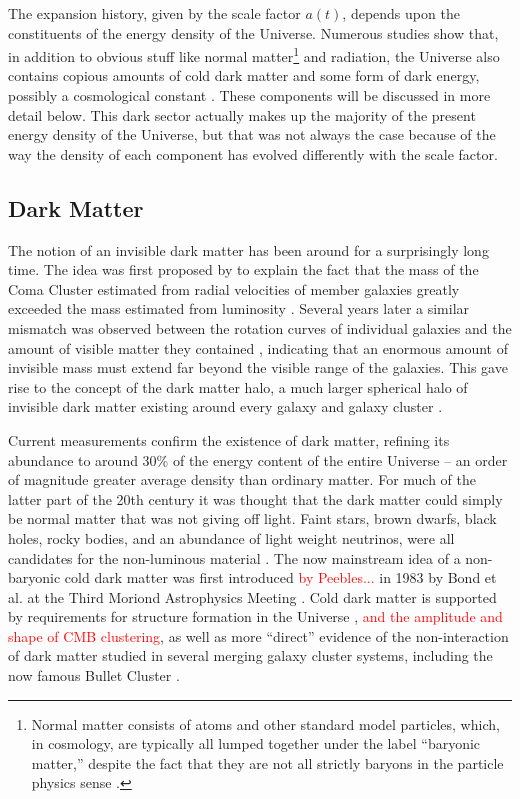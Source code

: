 The expansion history, given by the scale factor $a(t)$, depends upon the constituents of the energy density of the Universe. Numerous studies show that, in addition to obvious stuff like normal matter\footnote{Normal matter consists of atoms and other standard model particles, which, in cosmology, are typically all lumped together under the label ``baryonic matter,'' despite the fact that they are not all strictly baryons in the particle physics sense \citep{RydenText}.} and radiation, the Universe also contains copious amounts of cold dark matter and some form of dark energy, possibly a cosmological constant \citep[e.g.][]{DodelsonText}. These components will be discussed in more detail below. This dark sector actually makes up the majority of the present energy density of the Universe, but that was not always the case because of the way the density of each component has evolved differently with the scale factor.

\subsection{Dark Matter}
\label{sec:DM}

The notion of an invisible dark matter has been around for a surprisingly long time. The idea was first proposed by \citet{Zwicky33} to explain the fact that the mass of the Coma Cluster estimated from radial velocities of member galaxies greatly exceeded the mass estimated from luminosity \citep[see also][]{Zwicky37}. Several years later a similar mismatch was observed between the rotation curves of individual galaxies and the amount of visible matter they contained \citep{Babcock39}, indicating that an enormous amount of invisible mass must extend far beyond the visible range of the galaxies. This gave rise to the concept of the dark matter halo, a much larger spherical halo of invisible dark matter existing around every galaxy and galaxy cluster \citep[see][for a review of dark matter's discovery]{Bergh99}.

Current measurements confirm the existence of dark matter, refining its abundance to around 30\% of the energy content of the entire Universe -- an order of magnitude greater average density than ordinary matter. For much of the latter part of the 20th century it was thought that the dark matter could simply be normal matter that was not giving off light. Faint stars, brown dwarfs, black holes, rocky bodies, and an abundance of light weight neutrinos, were all candidates for the non-luminous material \citep{Bergh99}. The now mainstream idea of a non-baryonic cold dark matter was first introduced \textcolor{red}{by Peebles...} in 1983 by Bond et al. at the Third Moriond Astrophysics Meeting \citep{Bond83}. Cold dark matter is supported by requirements for structure formation in the Universe \citep{BS01}, \textcolor{red}{and the amplitude and shape of \ac{CMB} clustering}, as well as more ``direct'' evidence of the non-interaction of dark matter studied in several merging galaxy cluster systems, including the now famous Bullet Cluster \citep[][see also \autoref{sec:ClusterAstro}]{Clowe06}.

